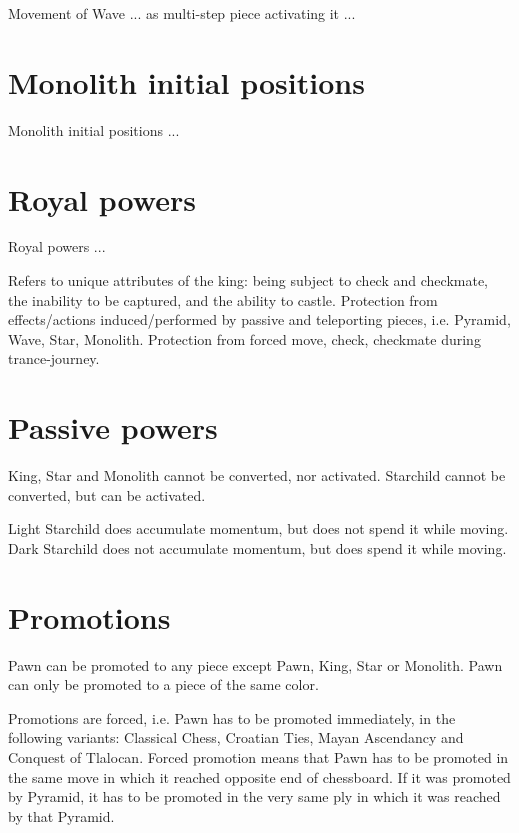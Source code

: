 Movement of Wave ... as multi-step piece activating it  ...


\section*{Monolith initial positions}
\label{sec:Definitions/Monolith initial positions}

Monolith initial positions ...

\section*{Royal powers}
\label{sec:Definitions/Royal powers}

Royal powers ...

    Refers to unique attributes of the king: being subject to check and checkmate, the inability to be captured, and the ability to castle.
    Protection from effects/actions induced/performed by passive and teleporting pieces, i.e. Pyramid, Wave, Star, Monolith.
    Protection from forced move, check, checkmate during trance-journey.


\section*{Passive powers}
\label{sec:Definitions/Passive powers}

King, Star and Monolith cannot be converted, nor activated.
Starchild cannot be converted, but can be activated.

Light Starchild does accumulate momentum, but does not spend it while moving.
Dark Starchild does not accumulate momentum, but does spend it while moving.

\section*{Promotions}
\label{sec:Definitions/Promotions}

Pawn can be promoted to any piece except Pawn, King, Star or Monolith.
Pawn can only be promoted to a piece of the same color.

Promotions are forced, i.e. Pawn has to be promoted immediately, in the following
variants: Classical Chess, Croatian Ties, Mayan Ascendancy and Conquest of Tlalocan.
Forced promotion means that Pawn has to be promoted in the same move in which it
reached opposite end of chessboard. If it was promoted by Pyramid, it has to be
promoted in the very same ply in which it was reached by that Pyramid.

